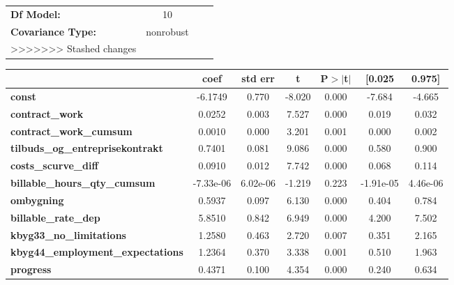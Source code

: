 \begin{center}
\begin{tabular}{lclc}
\textbf{Df Model:}                       &            10       & \textbf{                     } &             \\
\textbf{Covariance Type:}                &      nonrobust      & \textbf{                     } &             \\
>>>>>>> Stashed changes
\bottomrule
\end{tabular}
\begin{tabular}{lcccccc}
                                          & \textbf{coef} & \textbf{std err} & \textbf{t} & \textbf{P$> |$t$|$} & \textbf{[0.025} & \textbf{0.975]}  \\
\midrule
\textbf{const}                            &      -6.1749  &        0.770     &    -8.020  &         0.000        &       -7.684    &       -4.665     \\
\textbf{contract\_work}                   &       0.0252  &        0.003     &     7.527  &         0.000        &        0.019    &        0.032     \\
\textbf{contract\_work\_cumsum}           &       0.0010  &        0.000     &     3.201  &         0.001        &        0.000    &        0.002     \\
\textbf{tilbuds\_og\_entreprisekontrakt}  &       0.7401  &        0.081     &     9.086  &         0.000        &        0.580    &        0.900     \\
\textbf{costs\_scurve\_diff}              &       0.0910  &        0.012     &     7.742  &         0.000        &        0.068    &        0.114     \\
\textbf{billable\_hours\_qty\_cumsum}     &    -7.33e-06  &     6.02e-06     &    -1.219  &         0.223        &    -1.91e-05    &     4.46e-06     \\
\textbf{ombygning}                        &       0.5937  &        0.097     &     6.130  &         0.000        &        0.404    &        0.784     \\
\textbf{billable\_rate\_dep}              &       5.8510  &        0.842     &     6.949  &         0.000        &        4.200    &        7.502     \\
\textbf{kbyg33\_no\_limitations}          &       1.2580  &        0.463     &     2.720  &         0.007        &        0.351    &        2.165     \\
\textbf{kbyg44\_employment\_expectations} &       1.2364  &        0.370     &     3.338  &         0.001        &        0.510    &        1.963     \\
\textbf{progress}                         &       0.4371  &        0.100     &     4.354  &         0.000        &        0.240    &        0.634     \\

\end{tabular}
\end{center}
